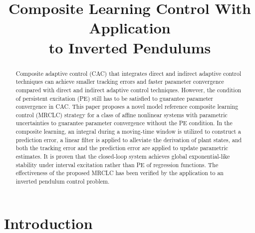 \documentclass[conference]{IEEEtran}
\begin{document}
\title{Composite Learning Control With Application\\to Inverted Pendulums}




\author{
}


\maketitle


\begin{abstract}
Composite adaptive control (CAC) that integrates direct and indirect adaptive control techniques can achieve smaller tracking errors and faster parameter convergence compared with direct and indirect adaptive control techniques. However, the condition of persistent excitation (PE) still has to be satisfied to guarantee parameter convergence in CAC. This paper proposes a novel model reference composite learning control (MRCLC) strategy for a class of affine nonlinear systems with parametric uncertainties to guarantee parameter convergence without the PE condition. In the composite learning, an integral during a moving-time window is utilized to construct a prediction error, a linear filter is applied to alleviate the derivation of plant states, and both the tracking error and the prediction error are applied to update parametric estimates. It is proven that the closed-loop system achieves global exponential-like stability under interval excitation rather than PE of regression functions. The effectiveness of the proposed MRCLC has been verified by the application to an inverted pendulum control problem.

\end{abstract}


\IEEEpeerreviewmaketitle

\section{Introduction}
\end{document}
